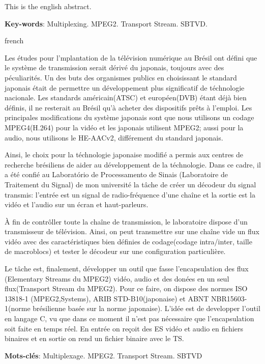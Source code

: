 \documentclass[
	12pt,				%
	openright,			%
	twoside,			%
	a4paper,			%
	brazil,
	french,				%
	english
	]{abntex2}
\begin{document}
\begin{resumo}[Abstract]

   This is the english abstract.

   \vspace{\onelineskip}
 
   \noindent 
   \textbf{Key-words}: Multiplexing. MPEG2. Transport Stream. SBTVD.
 
\end{resumo}

\begin{resumo}[Résumé]
 \begin{otherlanguage*}{french}
 
 Les études pour l'mplantation de la télévision numérique au Brésil ont défini que le système de transmission serait dérivé du japonais, toujours avec des péculiarités. Un des buts des organismes publics en choisissant le standard japonais était de permettre un développement plus significatif de téchnologie nacionale. Les standards américain(ATSC) et européen(DVB) étant déjà bien définis, il ne resterait au Brésil qu'à acheter des dispositifs prêts à l'emploi. Les principales modifications du système japonais sont que nous utilisons un codage MPEG4(H.264) pour la vidéo et les japonais utilisent MPEG2; aussi pour la audio, nous utilisons le HE-AACv2, différement du standard japonais.

Ainsi, le choix pour la téchnologie japonaise modifié a permis aux centres de recherche brésiliens de aider au développement de la téchnologie. Dans ce cadre, il a été confié au Laboratório de Processamento de Sinais (Laboratoire de Traitement du Signal) de mon université la tâche de créer un décodeur du signal transmis: l'entrée est un signal de radio-fréquence d'une chaîne et la sortie est la vidéo et l'audio sur un écran et haut-parleurs.

À fin de contrôller toute la chaîne de transmission, le laboratoire dispose d'un transmisseur de télévision. Ainsi, on peut transmettre sur une chaîne vide un flux vidéo avec des caractéristiques bien définies de codage(codage intra/inter, taille de macroblocs) et tester le décodeur sur une configuration particulière.

Le tâche est, finalement, développer un outil que fasse l'encapsulation des flux (Elementary Streams du MPEG2) vidéo, audio et des donées en un seul flux(Transport Stream du MPEG2). Pour ce faire, on dispose des normes ISO 13818-1 (MPEG2,Systems), ARIB STD-B10(japonaise) et ABNT NBR15603-1(norme brésilienne basée sur la norme japonaise). L'idée est de developper l'outil en langage C, vu que dans ce moment il n'est pas nécessaire que l'encapsulation soit faite en temps réel. En entrée on reçoit des ES vidéo et audio en fichiers binaires et en sortie on rend un fichier binaire avec le TS.

   \textbf{Mots-clés}: Multiplexage. MPEG2. Transport Stream. SBTVD
 \end{otherlanguage*}
\end{resumo}
\end{document}
